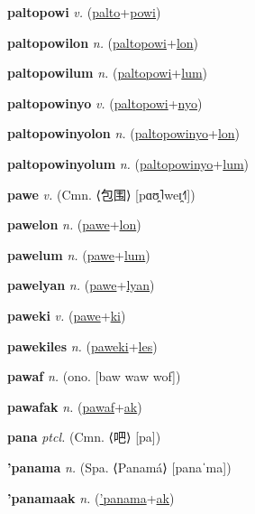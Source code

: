 \textbf{\hypertarget{paltopowi}{paltopowi}} \textit{v.} (\hyperlink{palto}{palto}+\allowbreak \hyperlink{powi}{powi})


\textbf{\hypertarget{paltopowilon}{paltopowilon}} \textit{n.} (\hyperlink{paltopowi}{paltopowi}+\allowbreak \hyperlink{lon}{lon})


\textbf{\hypertarget{paltopowilum}{paltopowilum}} \textit{n.} (\hyperlink{paltopowi}{paltopowi}+\allowbreak \hyperlink{lum}{lum})


\textbf{\hypertarget{paltopowinyo}{paltopowinyo}} \textit{v.} (\hyperlink{paltopowi}{paltopowi}+\allowbreak \hyperlink{nyo}{nyo})


\textbf{\hypertarget{paltopowinyolon}{paltopowinyolon}} \textit{n.} (\hyperlink{paltopowinyo}{paltopowinyo}+\allowbreak \hyperlink{lon}{lon})


\textbf{\hypertarget{paltopowinyolum}{paltopowinyolum}} \textit{n.} (\hyperlink{paltopowinyo}{paltopowinyo}+\allowbreak \hyperlink{lum}{lum})


\textbf{\hypertarget{pawe}{pawe}} \textit{v.} (Cmn. ⟨{\chinese{}包围}⟩ [pɑʊ̯˥weɪ̯˧˥])


\textbf{\hypertarget{pawelon}{pawelon}} \textit{n.} (\hyperlink{pawe}{pawe}+\allowbreak \hyperlink{lon}{lon})


\textbf{\hypertarget{pawelum}{pawelum}} \textit{n.} (\hyperlink{pawe}{pawe}+\allowbreak \hyperlink{lum}{lum})


\textbf{\hypertarget{pawelyan}{pawelyan}} \textit{n.} (\hyperlink{pawe}{pawe}+\allowbreak \hyperlink{lyan}{lyan})


\textbf{\hypertarget{paweki}{paweki}} \textit{v.} (\hyperlink{pawe}{pawe}+\allowbreak \hyperlink{ki}{ki})


\textbf{\hypertarget{pawekiles}{pawekiles}} \textit{n.} (\hyperlink{paweki}{paweki}+\allowbreak \hyperlink{les}{les})


\textbf{\hypertarget{pawaf}{pawaf}} \textit{n.} (ono. [baw waw wof])


\textbf{\hypertarget{pawafak}{pawafak}} \textit{n.} (\hyperlink{pawaf}{pawaf}+\allowbreak \hyperlink{ak}{ak})


\textbf{\hypertarget{pana}{pana}} \textit{ptcl.} (Cmn. ⟨{\chinese{}吧}⟩ [pa])


\textbf{\hypertarget{'panama}{'panama}} \textit{n.} (Spa. ⟨Panamá⟩ [panaˈma])


\textbf{\hypertarget{'panamaak}{'panamaak}} \textit{n.} (\hyperlink{'panama}{'panama}+\allowbreak \hyperlink{ak}{ak})


